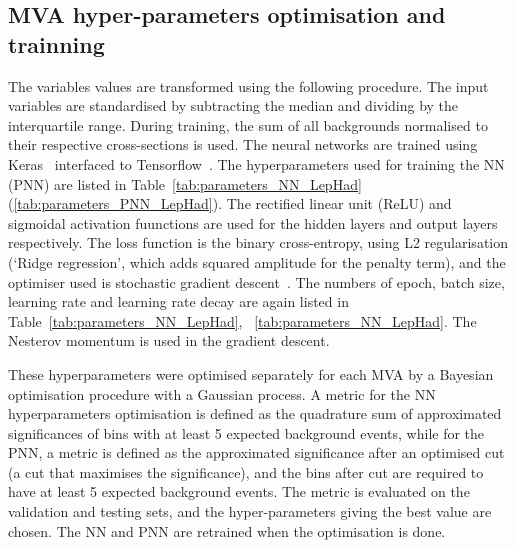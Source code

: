 \subsection{MVA hyper-parameters optimisation and trainning}
\label{section:MVA hyper-parameters}
The variables values are transformed using the following procedure.
The input variables are standardised by subtracting the median and dividing by the
interquartile range.
During training, the sum of all backgrounds normalised to
their respective cross-sections is used. 
The neural networks are trained using
Keras~\cite{keras} interfaced to Tensorflow~\cite{tensorflow}.
The hyperparameters used for training the NN (PNN) are 
listed in Table~\ref{tab:parameters_NN_LepHad} (\ref{tab:parameters_PNN_LepHad}).
The rectified linear unit (ReLU) and sigmoidal activation fuunctions 
are used for the hidden layers and output layers respectively.
The loss function is the binary cross-entropy, 
using L2 regularisation (`Ridge regression', which adds squared amplitude 
for the penalty term), and the optimiser used 
is stochastic gradient descent~\cite{Goodfellow-et-al-2016}.
The numbers of epoch, batch size, learning rate and 
learning rate decay are again listed in Table~\ref{tab:parameters_NN_LepHad},
~\ref{tab:parameters_NN_LepHad}. 
The Nesterov momentum is used in the gradient descent. 

These hyperparameters were optimised 
separately for each MVA by a Bayesian optimisation procedure with 
a Gaussian process. 
A metric for the NN hyperparameters optimisation is defined 
as the quadrature sum of approximated significances
of bins with at least 5 expected background events,
while for the PNN, a metric is defined as the approximated
significance after an optimised cut (a cut that maximises the 
significance), and the bins after cut are required to have 
at least 5 expected background events. 
The metric is evaluated on the validation and testing sets,
and the hyper-parameters giving the best value are chosen. 
The NN and PNN are retrained when the optimisation is done. 

